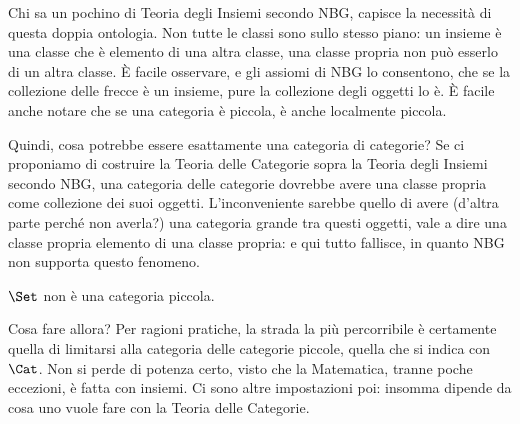 Chi sa un pochino di Teoria degli Insiemi secondo NBG, capisce la necessità di questa doppia ontologia. Non tutte le classi sono sullo stesso piano: un insieme è una classe che è elemento di una altra classe, una classe propria non può esserlo di un altra classe. È facile osservare, e gli assiomi di NBG lo consentono, che se la collezione delle frecce è un insieme, pure la collezione degli oggetti lo è. È facile anche notare che se una categoria è piccola, è anche localmente piccola.

Quindi, cosa potrebbe essere esattamente una categoria di categorie? Se ci proponiamo di costruire la Teoria delle Categorie sopra la Teoria degli Insiemi secondo NBG, una categoria delle categorie dovrebbe avere una classe propria come collezione dei suoi oggetti. L'inconveniente sarebbe quello di avere (d'altra parte perché non averla?) una categoria grande tra questi oggetti, vale a dire una classe propria elemento di una classe propria: e qui tutto fallisce, in quanto NBG non supporta questo fenomeno.

\begin{esempio}
\(\Set\) non è una categoria piccola.
\end{esempio}

Cosa fare allora? Per ragioni pratiche, la strada la più percorribile è certamente quella di limitarsi alla categoria delle categorie piccole, quella che si indica con \(\Cat\). Non si perde di potenza certo, visto che la Matematica, tranne poche eccezioni, è fatta con insiemi. Ci sono altre impostazioni poi: insomma dipende da cosa uno vuole fare con la Teoria delle Categorie.

